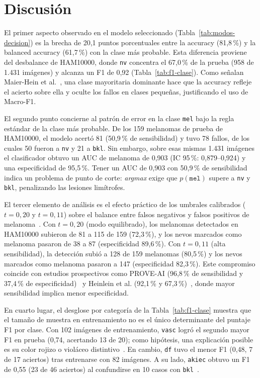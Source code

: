 \section{Discusión}

El primer aspecto observado en el modelo seleccionado (Tabla~\ref{tab:modos-decision}) es la brecha de 20,1 puntos porcentuales entre la accuracy (81,8\,\%) y la balanced accuracy (61,7\,\%) con la clase más probable. Esta diferencia proviene del desbalance de HAM10000, donde \texttt{nv} concentra el 67,0\,\% de la prueba (958 de 1.431 imágenes) y alcanza un F1 de 0,92 (Tabla~\ref{tab:f1-clase}). Como señalan Maier-Hein et al.~\cite{maierhein2024metrics}, una clase mayoritaria dominante hace que la accuracy refleje el acierto sobre ella y oculte los fallos en clases pequeñas, justificando el uso de Macro-F1.

El segundo punto concierne al patrón de error en la clase \texttt{mel} bajo la regla estándar de la clase más probable. De los 159 melanomas de prueba de HAM10000, el modelo acertó 81 (50,9\,\% de sensibilidad) y tuvo 78 fallos, de los cuales 50 fueron a \texttt{nv} y 21 a \texttt{bkl}. Sin embargo, sobre esas mismas 1.431 imágenes el clasificador obtuvo un AUC de melanoma de 0,903 (IC 95\,\%: 0,879--0,924) y una especificidad de 95,5\,\%. Tener un AUC de 0,903 con 50,9\,\% de sensibilidad indica un problema de punto de corte: \textit{argmax} exige que $p(\texttt{mel})$ supere a \texttt{nv} y \texttt{bkl}, penalizando las lesiones limítrofes.

El tercer elemento de análisis es el efecto práctico de los umbrales calibrados ($t = 0{,}20$ y $t = 0{,}11$) sobre el balance entre falsos negativos y falsos positivos de melanoma~\cite{barata2023reinforcement}. Con $t = 0{,}20$ (modo equilibrado), los melanomas detectados en HAM10000 subieron de 81 a 115 de 159 (72,3\,\%), y los nevos marcados como melanoma pasaron de 38 a 87 (especificidad 89,6\,\%). Con $t = 0{,}11$ (alta sensibilidad), la detección subió a 128 de 159 melanomas (80,5\,\%) y los nevos marcados como melanoma pasaron a 147 (especificidad 82,3\,\%). Este compromiso coincide con estudios prospectivos como PROVE-AI (96,8\,\% de sensibilidad y 37,4\,\% de especificidad)~\cite{marchetti2023proveai} y Heinlein et al. (92,1\,\% y 67,3\,\%)~\cite{heinlein2024multicenter}, donde mayor sensibilidad implica menor especificidad.

En cuarto lugar, el desglose por categoría de la Tabla~\ref{tab:f1-clase} muestra que el tamaño de muestra en entrenamiento no es el único determinante del puntaje F1 por clase. Con 102 imágenes de entrenamiento, \texttt{vasc} logró el segundo mayor F1 en prueba (0,74, acertando 13 de 20); como hipótesis, una explicación posible es su color rojizo o violáceo distintivo~\cite{tschandl2018ham10000}. En cambio, \texttt{df} tuvo el menor F1 (0,48, 7 de 17 aciertos) tras entrenarse con 82 imágenes. A su lado, \texttt{akiec} obtuvo un F1 de 0,55 (23 de 46 aciertos) al confundirse en 10 casos con \texttt{bkl}~\cite{tschandl2018ham10000}.

